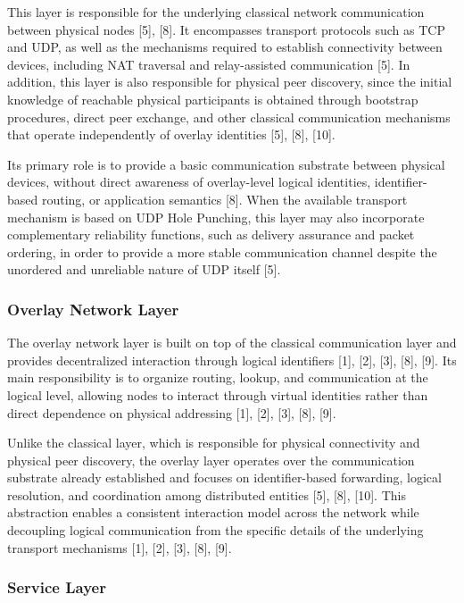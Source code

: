 \documentclass[12pt]{article}
\begin{document}
This layer is responsible for the underlying classical network communication between
physical nodes [5], [8]. It encompasses transport protocols such as TCP and UDP, as
well as the mechanisms required to establish connectivity between devices, including
NAT traversal and relay-assisted communication [5]. In addition, this layer is also
responsible for physical peer discovery, since the initial knowledge of reachable
physical participants is obtained through bootstrap procedures, direct peer exchange,
and other classical communication mechanisms that operate independently of overlay
identities [5], [8], [10].

Its primary role is to provide a basic communication substrate between physical
devices, without direct awareness of overlay-level logical identities, identifier-based
routing, or application semantics [8]. When the available transport mechanism is based
on UDP Hole Punching, this layer may also incorporate complementary reliability
functions, such as delivery assurance and packet ordering, in order to provide a more
stable communication channel despite the unordered and unreliable nature of UDP
itself [5].

\subsubsection{Overlay Network Layer}

The overlay network layer is built on top of the classical communication layer and
provides decentralized interaction through logical identifiers [1], [2], [3], [8], [9]. Its main
responsibility is to organize routing, lookup, and communication at the logical level,
allowing nodes to interact through virtual identities rather than direct dependence on
physical addressing [1], [2], [3], [8], [9].

Unlike the classical layer, which is responsible for physical connectivity and physical
peer discovery, the overlay layer operates over the communication substrate already
established and focuses on identifier-based forwarding, logical resolution, and
coordination among distributed entities [5], [8], [10]. This abstraction enables a consistent
interaction model across the network while decoupling logical communication from
the specific details of the underlying transport mechanisms [1], [2], [3], [8], [9].

\subsubsection{Service Layer}
\end{document}
